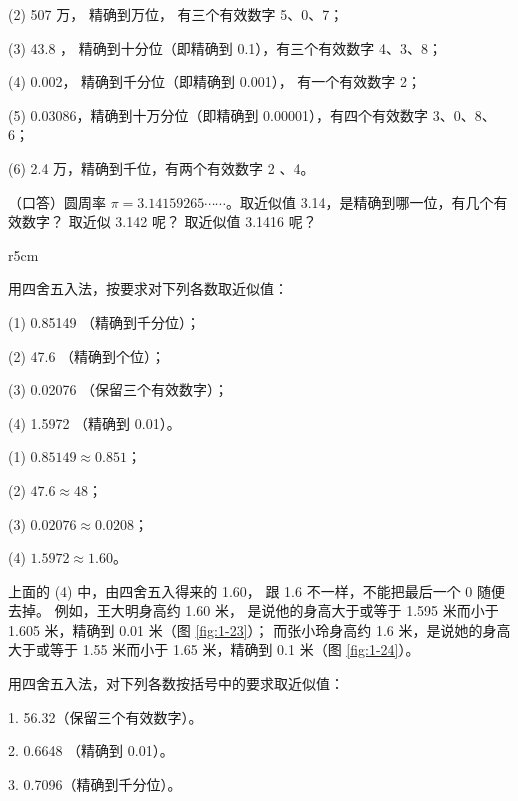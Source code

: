 (2) 507 万， 精确到万位， 有三个有效数字 5、0、7；

(3) 43.8 ， 精确到十分位（即精确到 0.1），有三个有效数字 4、3、8；

(4) 0.002， 精确到千分位（即精确到 0.001）， 有一个有效数字 2；

(5) 0.03086，精确到十万分位（即精确到 0.00001），有四个有效数字 3、0、8、6；

(6) 2.4 万，精确到千位，有两个有效数字 2 、4。


\lianxi

（口答）圆周率 $\pi = 3.14159265\cdots\cdots$。取近似值 3.14，是精确到哪一位，有几个有效数字？
取近似 3.142 呢？ 取近似值 3.1416 呢？

\lianxijiange

\begin{wrapfigure}{r}{5cm}
    \begin{minipage}{2cm}
        \centering
        
        \caption{}\label{fig:1-23}
    \end{minipage}
    \qquad
    \begin{minipage}{2cm}
        \centering
        
        \caption{}\label{fig:1-24}
    \end{minipage}
\end{wrapfigure}


\liti 用四舍五入法，按要求对下列各数取近似值：

(1) 0.85149 （精确到千分位）；

(2) 47.6 （精确到个位）；

(3) 0.02076 （保留三个有效数字）；

(4) 1.5972 （精确到 0.01）。

\jie (1) $0.85149 \approx 0.851$；

(2) $47.6 \approx 48$；

(3) $0.02076 \approx 0.0208$；

(4) $1.5972 \approx 1.60$。

\zhuyi 上面的 (4) 中，由四舍五入得来的 1.60， 跟 1.6 不一样，不能把最后一个 0 随便去掉。
例如，王大明身高约 1.60 米， 是说他的身高大于或等于 1.595 米而小于 1.605 米，精确到 0.01 米（图 \ref{fig:1-23}）；
而张小玲身高约 1.6 米，是说她的身高大于或等于 1.55 米而小于 1.65 米，精确到 0.1 米（图 \ref{fig:1-24}）。


\lianxi

用四舍五入法，对下列各数按括号中的要求取近似值：

1. 56.32（保留三个有效数字）。

2. 0.6648 （精确到 0.01）。

3. 0.7096（精确到千分位）。

